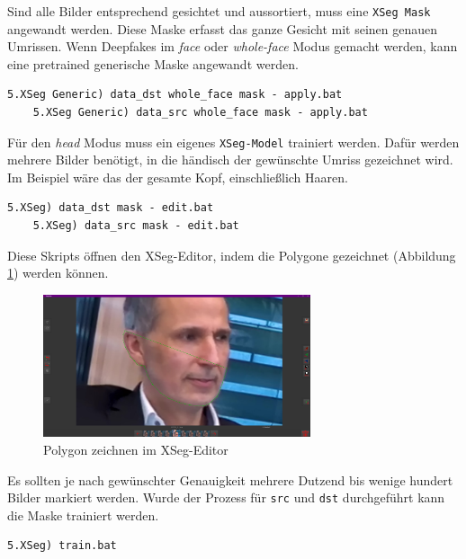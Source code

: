 Sind alle Bilder entsprechend gesichtet und aussortiert, muss eine \texttt{XSeg Mask} angewandt werden.
Diese Maske erfasst das ganze Gesicht mit seinen genauen Umrissen.
Wenn Deepfakes im \textit{face} oder \textit{whole-face} Modus gemacht werden, kann eine pretrained generische Maske angewandt werden.
\begin{lstlisting}[label={lst:extraction-5},numbers=none]
    5.XSeg Generic) data_dst whole_face mask - apply.bat
    5.XSeg Generic) data_src whole_face mask - apply.bat
\end{lstlisting}
Für den \textit{head} Modus muss ein eigenes \texttt{XSeg-Model} trainiert werden.
Dafür werden mehrere Bilder benötigt, in die händisch der gewünschte Umriss gezeichnet wird.
Im Beispiel wäre das der gesamte Kopf, einschließlich Haaren.
\begin{lstlisting}[numbers=none,label={lst:extraction-6}]
    5.XSeg) data_dst mask - edit.bat
    5.XSeg) data_src mask - edit.bat
\end{lstlisting}
Diese Skripts öffnen den XSeg-Editor, indem die Polygone gezeichnet (Abbildung \ref{fig:xseg-editor-1}) werden können.
\begin{figure}
    \center
    \includegraphics[width=0.7\textwidth]{Bilder/DFL/XSegEditor-1-draw}
    \caption{Polygon zeichnen im XSeg-Editor}
    \label{fig:xseg-editor-1}
\end{figure}
Es sollten je nach gewünschter Genauigkeit mehrere Dutzend bis wenige hundert Bilder markiert werden.
Wurde der Prozess für \texttt{src} und \texttt{dst} durchgeführt kann die Maske trainiert werden.
\begin{lstlisting}[label={lst:extraction-7},numbers=none]
    5.XSeg) train.bat
\end{lstlisting}
